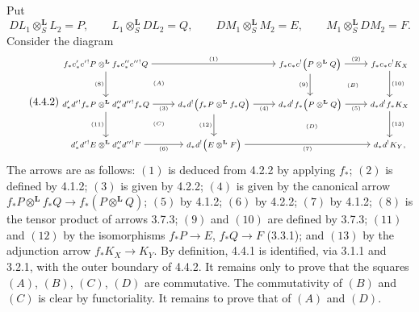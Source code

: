 \begin{prooftext}[Proof]
Put
\[
DL_1\otimes_S^{\mathbf L}L_2=P,\qquad
L_1\otimes_S^{\mathbf L}DL_2=Q,\qquad
DM_1\otimes_S^{\mathbf L}M_2=E,\qquad
M_1\otimes_S^{\mathbf L}DM_2=F.
\]
Consider the diagram
\begin{equation}
\tag{4.4.2}
{\scriptsize
\begin{tikzcd}[column sep=2.6em,row sep=2.6em]
f_*c'_*c'{}^!P\otimes^{\mathbf L} f_*c''_*c''{}^!Q
  \arrow[rr,"(1)"] \arrow[d,"(8)"'] &&
f_*c_*c^!\bigl(P\otimes^{\mathbf L}Q\bigr)
  \arrow[r,"(2)"] \arrow[d,"(9)"'] &
f_*c_*c^!K_X \arrow[d,"(10)"]\\
d'_*d'{}^!f_*P\otimes^{\mathbf L}d''_*d''{}^!f_*Q
  \arrow[r,"(3)"'] \arrow[d,"(11)"'] &
d_*d^!\bigl(f_*P\otimes^{\mathbf L}f_*Q\bigr)
  \arrow[r,"(4)"'] \arrow[d,"(12)"'] &
d_*d^!f_*\bigl(P\otimes^{\mathbf L}Q\bigr)
  \arrow[r,"(5)"'] &
d_*d^!f_*K_X \arrow[d,"(13)"]\\
d'_*d'{}^!E\otimes^{\mathbf L}d''_*d''{}^!F
  \arrow[r,"(6)"'] &
d_*d^!\bigl(E\otimes^{\mathbf L}F\bigr)
  \arrow[rr,"(7)"'] &&
d_*d^!K_Y,
\arrow[from=1-1,to=2-2, phantom, "\scriptstyle (A)"]
\arrow[from=1-3,to=2-4, phantom, "\scriptstyle (B)"]
\arrow[from=2-1,to=3-2, phantom, "\scriptstyle (C)"]
\arrow[from=2-2,to=3-4, phantom, "\scriptstyle (D)"]
\end{tikzcd}
}
\end{equation}
The arrows are as follows: $(1)$ is deduced from 4.2.2 by applying $f_*$; $(2)$ is defined by 4.1.2; $(3)$ is given by 4.2.2; $(4)$ is given by the canonical arrow $f_*P\otimes^{\mathbf L}f_*Q\longrightarrow f_*(P\otimes^{\mathbf L}Q)$; $(5)$ by 4.1.2; $(6)$ by 4.2.2; $(7)$ by 4.1.2; $(8)$ is the tensor product of arrows 3.7.3; $(9)$ and $(10)$ are defined by 3.7.3; $(11)$ and $(12)$ by the isomorphisms $f_*P\longrightarrow E$, $f_*Q\longrightarrow F$ (3.3.1); and $(13)$ by the adjunction arrow $f_*K_X\longrightarrow K_Y$. By definition, 4.4.1 is identified, via 3.1.1 and 3.2.1, with the outer boundary of 4.4.2. It remains only to prove that the squares $(A)$, $(B)$, $(C)$, $(D)$ are commutative. The commutativity of $(B)$ and $(C)$ is clear by functoriality. It remains to prove that of $(A)$ and $(D)$.


\end{prooftext}
